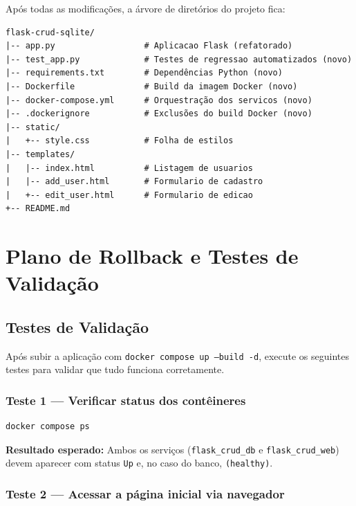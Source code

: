 \documentclass[12pt,a4paper]{article}
\begin{document}
Após todas as modificações, a árvore de diretórios do projeto fica:

\begin{lstlisting}[caption={Árvore de diretórios do projeto refatorado.}]
flask-crud-sqlite/
|-- app.py                  # Aplicacao Flask (refatorado)
|-- test_app.py             # Testes de regressao automatizados (novo)
|-- requirements.txt        # Dependências Python (novo)
|-- Dockerfile              # Build da imagem Docker (novo)
|-- docker-compose.yml      # Orquestração dos servicos (novo)
|-- .dockerignore           # Exclusões do build Docker (novo)
|-- static/
|   +-- style.css           # Folha de estilos
|-- templates/
|   |-- index.html          # Listagem de usuarios
|   |-- add_user.html       # Formulario de cadastro
|   +-- edit_user.html      # Formulario de edicao
+-- README.md
\end{lstlisting}

\section{Plano de Rollback e Testes de Validação}
\label{sec:rollback}

\subsection{Testes de Validação}

Após subir a aplicação com \texttt{docker compose up --build -d}, execute os
seguintes testes para validar que tudo funciona corretamente.

\subsubsection{Teste 1 — Verificar status dos contêineres}

\begin{lstlisting}[language=bash, caption={Verificação do estado dos contêineres.}]
docker compose ps
\end{lstlisting}

\textbf{Resultado esperado:} Ambos os serviços (\texttt{flask\_crud\_db} e
\texttt{flask\_crud\_web}) devem aparecer com status \texttt{Up} e, no caso do
banco, \texttt{(healthy)}.

\subsubsection{Teste 2 — Acessar a página inicial via navegador}
\end{document}
